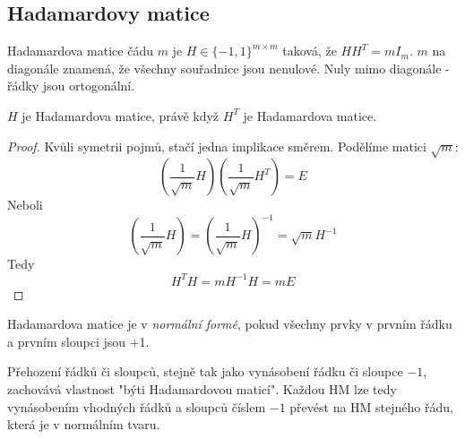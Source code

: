 \subsection{Hadamardovy matice}

\begin{definition}
    Hadamardova matice čádu $m$ je $H\in\{-1,1\}^{m\times m}$ taková, že $HH^T=mI_m$.
    $m$ na diagonále znamená, že všechny souřadnice jsou nenulové.
    Nuly mimo diagonále - řádky jsou ortogonální.
\end{definition}
\begin{lemma}
    $H$ je Hadamardova matice, právě když $H^T$ je Hadamardova matice.
\end{lemma}
\begin{proof}
	Kvůli symetrii pojmů, stačí jedna implikace směrem.
	Podělíme matici $\sqrt{m}$:
	\[ \left(\frac{1}{\sqrt{m}} H \right) \left(\frac{1}{\sqrt{m}} H^T \right) = E \]
	Neboli
	\[ \left(\frac{1}{\sqrt{m}} H \right) = \left(\frac{1}{\sqrt{m}} H \right)^{-1} = \sqrt{m}H^{-1} \]
	Tedy
	\[ H^T H = m H^{-1}H = mE \]
\end{proof}

\begin{definition}
	Hadamardova matice je v \emph{normální formě}, pokud všechny prvky v prvním řádku a prvním sloupci jsou +1.
\end{definition}

\begin{observation}[Uzavřenost HM]\label{hm_close}
	Přehození řádků či sloupců, stejně tak jako vynásobení řádku či sloupce $-1$, zachovává vlastnost "býti Hadamardovou maticí".
	Každou HM lze tedy vynásobením vhodných řádků a sloupců číslem $-1$ převést na HM stejného řádu, která je v normálním tvaru.
\end{observation}

